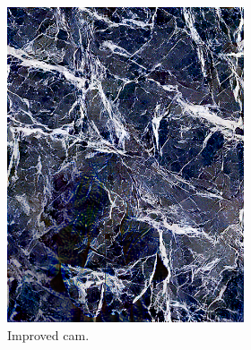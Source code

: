 \begin{figure}[]
\begin{subfigure}{\textwidth}
\begin{subfigure}{0.24\textwidth}
            \includegraphics[width=\textwidth]{images/04-experiment02/human/marble/improved_proj.jpg}
            \caption{Improved cam.}
            \label{fig:ex02-human-marble-improved_proj}
        \end{subfigure}
        \hfill
        \begin{subfigure}{0.24\textwidth}
            \centering

\end{subfigure}
\end{subfigure}
\end{figure}
